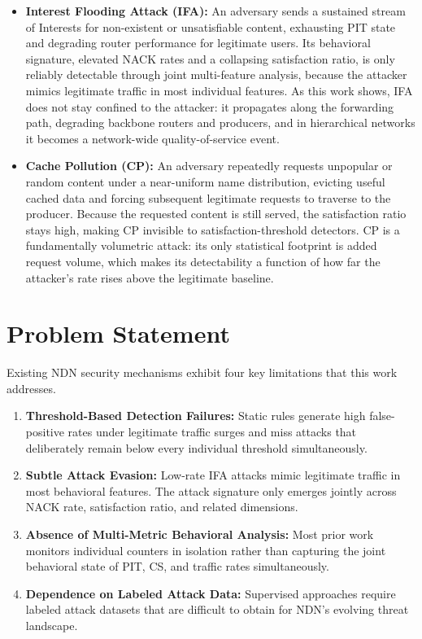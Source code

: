 \documentclass[12pt]{report}
\begin{document}
\begin{itemize}
    \item \textbf{Interest Flooding Attack (IFA):} An adversary sends a sustained stream of Interests for non-existent or unsatisfiable content, exhausting PIT state and degrading router performance for legitimate users. Its behavioral signature, elevated NACK rates and a collapsing satisfaction ratio, is only reliably detectable through joint multi-feature analysis, because the attacker mimics legitimate traffic in most individual features. As this work shows, IFA does not stay confined to the attacker: it propagates along the forwarding path, degrading backbone routers and producers, and in hierarchical networks it becomes a network-wide quality-of-service event.

    \item \textbf{Cache Pollution (CP):} An adversary repeatedly requests unpopular or random content under a near-uniform name distribution, evicting useful cached data and forcing subsequent legitimate requests to traverse to the producer. Because the requested content is still served, the satisfaction ratio stays high, making CP invisible to satisfaction-threshold detectors. CP is a fundamentally volumetric attack: its only statistical footprint is added request volume, which makes its detectability a function of how far the attacker's rate rises above the legitimate baseline.
\end{itemize}

\section{Problem Statement}

Existing NDN security mechanisms exhibit four key limitations that this work addresses.

\begin{enumerate}
    \item \textbf{Threshold-Based Detection Failures:} Static rules generate high false-positive rates under legitimate traffic surges and miss attacks that deliberately remain below every individual threshold simultaneously.
    \item \textbf{Subtle Attack Evasion:} Low-rate IFA attacks mimic legitimate traffic in most behavioral features. The attack signature only emerges jointly across NACK rate, satisfaction ratio, and related dimensions.
    \item \textbf{Absence of Multi-Metric Behavioral Analysis:} Most prior work monitors individual counters in isolation rather than capturing the joint behavioral state of PIT, CS, and traffic rates simultaneously.
    \item \textbf{Dependence on Labeled Attack Data:} Supervised approaches require labeled attack datasets that are difficult to obtain for NDN's evolving threat landscape.
\end{enumerate}
\end{document}
